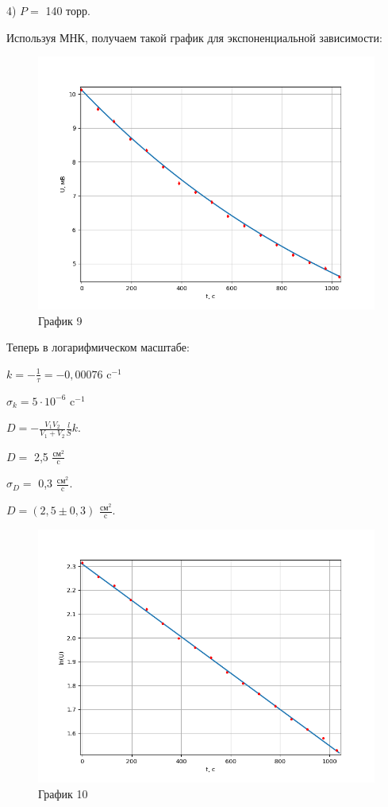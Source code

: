 \documentclass[a4paper,12pt]{article} %
\begin{document}
\begin{enumerate}
\newpage

4) $P = $ 140 торр.

Используя МНК, получаем такой график для экспоненциальной зависимости:
\begin{figure}[h!]
	\centering
	\includegraphics[scale=0.8]{График4(эксп).png}
	\caption*{График 9}
\end{figure}

Теперь в логарифмическом масштабе:

$k = -\frac{1}{\tau} = -0,00076$ c$^{-1}$

$\sigma_{k} = 5\cdot 10^{-6}$ c$^{-1}$

$D = - \frac{V_{1}V_{2}}{V_{1} + V_{2}}\frac{l}{S}k$.

$D = $ 2,5 $\frac{\text{см}^2}{\text{c}}$

$\sigma_{D} = $ 0,3 $\frac{\text{см}^2}{\text{c}}$.
\vspace{15mm}

$D = (2,5 \pm 0,3)$ $\frac{\text{см}^2}{\text{c}}$.
\newpage
\begin{figure}[h!]
	\centering
	\includegraphics[scale=0.8]{График4(лин).png}
	\caption*{График 10}
\end{figure}


\end{enumerate}
\end{document}
